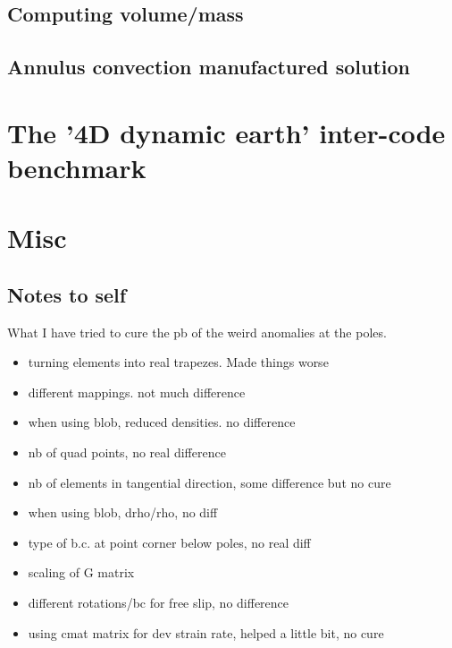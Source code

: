 \documentclass[a4paper,12pt]{article}
\begin{document}
\subsection{Computing volume/mass}


\subsection{Annulus convection manufactured solution}




\section{The '4D dynamic earth' inter-code benchmark}

\cite{krhb12}


\newpage
\appendix
\section{Misc}

\subsection{Notes to self}

What I have tried to cure the pb of the weird anomalies at the poles.

\begin{itemize}
\item turning elements into real trapezes. Made things worse
\item different mappings. not much difference
\item when using blob, reduced densities. no difference
\item nb of quad points, no real difference
\item nb of elements in tangential direction, some difference but no cure 
\item when using blob, drho/rho, no diff 
\item type of b.c. at point corner below poles, no real diff 
\item scaling of G matrix
\item different rotations/bc for free slip, no difference
\item using cmat matrix for dev strain rate, helped a little bit, no cure 
\end{itemize}
\end{document}
